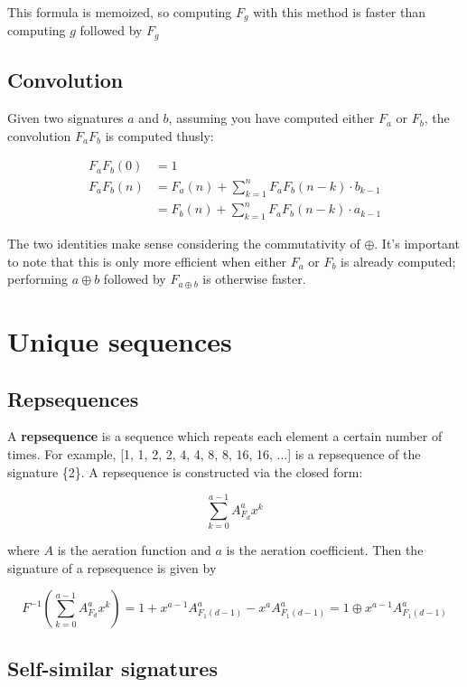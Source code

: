 \documentclass{article}
\begin{document}
\noindent This formula is memoized, so computing $F_g$ with this method is faster than computing $g$ followed by $F_g$\\

\subsection{Convolution}

Given two signatures $a$ and $b$, assuming you have computed either $F_a$ or $F_b$, the convolution $F_a F_b$ is computed thusly:

\begin{align*}
F_a F_b (0) &= 1\\
F_a F_b (n) &= F_a(n) + \sum_{k=1}^{n} F_a F_b (n-k) \cdot b_{k-1}\\
&= F_b(n) + \sum_{k=1}^{n} F_a F_b (n-k) \cdot a_{k-1}
\end{align*}

\noindent The two identities make sense considering the commutativity of $\oplus$. It's important to note that this is only more efficient when either $F_a$ or $F_b$ is already computed; performing $a \oplus b$ followed by $F_{a \oplus b}$ is otherwise faster.

\section{Unique sequences}

\subsection{Repsequences}

A \textbf{repsequence} is a sequence which repeats each element a certain number of times. For example, [1, 1, 2, 2, 4, 4, 8, 8, 16, 16, ...] is a repsequence of the signature \{2\}. A repsequence is constructed via the closed form:

$$\sum_{k=0}^{a-1} A_{F_d}^a x^k$$

\noindent where $A$ is the aeration function and $a$ is the aeration coefficient. Then the signature of a repsequence is given by

$$F^{-1} \left( \sum_{k=0}^{a-1} A_{F_d}^a x^k \right) = 1 + x^{a-1} A_{F_1 (d-1)}^a - x^a A_{F_1 (d-1)}^a = 1 \oplus x^{a-1} A_{F_1 (d-1)}^a$$

\subsection{Self-similar signatures}
\end{document}
